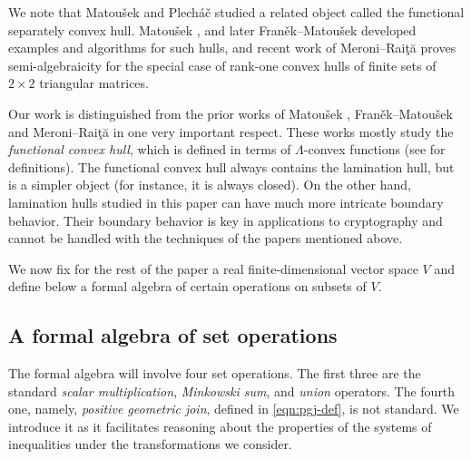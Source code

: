 \documentclass[10pt]{amsart}
\theoremstyle{plain}
\theoremstyle{definition}
\begin{document}
\medskip
We note  that
Matou\v{s}ek and Plech\'a\v{c} \cite{Matousek98}
studied 
a related object called the functional separately convex hull.  
Matou\v{s}ek \cite{Matousek2001}, 
and later Fran\v{e}k--Matou\v{s}ek \cite{Matousek-Franek2009}
developed examples and algorithms for 
such hulls,
and recent work of
Meroni--Rai\c{t}\u{a} \cite{Meroni2025} 
proves semi-algebraicity for the special case of rank-one convex
hulls of finite sets of \(2\times 2\) triangular matrices. 

\medskip
Our work is distinguished from the prior works of Matou\v{s}ek \cite{Matousek2001}, Fran\v{e}k--Matou\v{s}ek \cite{Matousek-Franek2009}
and
Meroni--Rai\c{t}\u{a} \cite{Meroni2025} in one very important respect. 
These works mostly study the \emph{functional convex hull},
which is defined in terms of $\Lambda$-convex functions (see \cite{Matousek2001} for definitions). The functional 
convex hull always contains the lamination hull, but is a simpler object (for instance, it is always closed). On the other hand, 
lamination hulls studied in this paper can have much more intricate boundary behavior. Their boundary behavior is key in applications to cryptography \cite{FOCS:BKMN22} and cannot be handled with the techniques of the papers mentioned above.

\medskip
We now fix for the rest of the paper a real finite-dimensional vector space $V$ and define below a 
formal algebra of certain operations on subsets of $V$.

\subsection{A formal algebra of set operations}
\label{subsec:formal-algebra}
The formal algebra will involve four set operations. 
The first three are the standard {\em scalar multiplication}, {\em Minkowski sum}, and {\em union} operators. 
The fourth one, namely, {\em positive geometric join}, defined in \eqref{eqn:pgj-def}, 
is not standard.
We introduce it as it facilitates reasoning about the properties of the systems of inequalities under the transformations we consider. 
\end{document}
